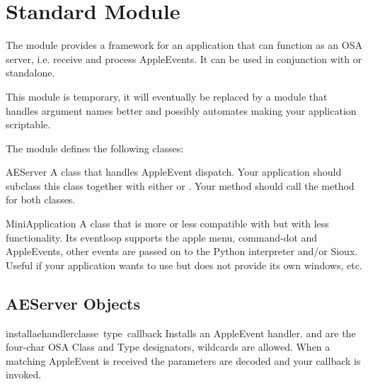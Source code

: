 \section{Standard Module }
\label{module-MiniAEFrame}

The module  provides a framework for an application
that can function as an OSA server, i.e. receive and process
AppleEvents. It can be used in conjunction with  or
standalone.

This module is temporary, it will eventually be replaced by a module
that handles argument names better and possibly automates making your
application scriptable.

The  module defines the following classes:


\begin{funcdesc}{AEServer}{}
A class that handles AppleEvent dispatch. Your application should
subclass this class together with either
 or
. Your  method should call
the  method for both classes.
\end{funcdesc}

\begin{funcdesc}{MiniApplication}{}
A class that is more or less compatible with
 but with less functionality. Its
eventloop supports the apple menu, command-dot and AppleEvents, other
events are passed on to the Python interpreter and/or Sioux.
Useful if your application wants to use  but does not
provide its own windows, etc.
\end{funcdesc}

\subsection{AEServer Objects}


\begin{funcdesc}{installaehandler}{classe\, type\, callback}
Installs an AppleEvent handler.  and  are the
four-char OSA Class and Type designators,  wildcards are
allowed. When a matching AppleEvent is received the parameters are
decoded and your callback is invoked.
\end{funcdesc}

